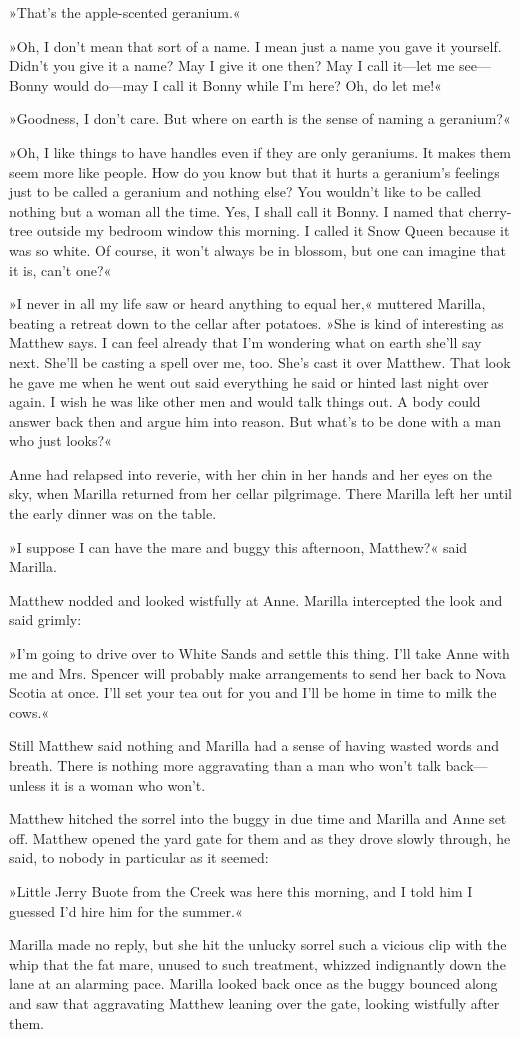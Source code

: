 »That's the apple-scented geranium.«

»Oh, I don't mean that sort of a name. I mean just a name you gave it yourself. Didn't you give it a name? May I give it one then? May I call it—let me see—Bonny would do—may I call it Bonny while I'm here? Oh, do let me!«

»Goodness, I don't care. But where on earth is the sense of naming a geranium?«

»Oh, I like things to have handles even if they are only geraniums. It makes them seem more like people. How do you know but that it hurts a geranium's feelings just to be called a geranium and nothing else? You wouldn't like to be called nothing but a woman all the time. Yes, I shall call it Bonny. I named that cherry-tree outside my bedroom window this morning. I called it Snow Queen because it was so white. Of course, it won't always be in blossom, but one can imagine that it is, can't one?«

»I never in all my life saw or heard anything to equal her,« muttered Marilla, beating a retreat down to the cellar after potatoes. »She is kind of interesting as Matthew says. I can feel already that I'm wondering what on earth she'll say next. She'll be casting a spell over me, too. She's cast it over Matthew. That look he gave me when he went out said everything he said or hinted last night over again. I wish he was like other men and would talk things out. A body could answer back then and argue him into reason. But what's to be done with a man who just looks?«

Anne had relapsed into reverie, with her chin in her hands and her eyes on the sky, when Marilla returned from her cellar pilgrimage. There Marilla left her until the early dinner was on the table.

»I suppose I can have the mare and buggy this afternoon, Matthew?« said Marilla.

Matthew nodded and looked wistfully at Anne. Marilla intercepted the look and said grimly:

»I'm going to drive over to White Sands and settle this thing. I'll take Anne with me and Mrs. Spencer will probably make arrangements to send her back to Nova Scotia at once. I'll set your tea out for you and I'll be home in time to milk the cows.«

Still Matthew said nothing and Marilla had a sense of having wasted words and breath. There is nothing more aggravating than a man who won't talk back—unless it is a woman who won't.

Matthew hitched the sorrel into the buggy in due time and Marilla and Anne set off. Matthew opened the yard gate for them and as they drove slowly through, he said, to nobody in particular as it seemed:

»Little Jerry Buote from the Creek was here this morning, and I told him I guessed I'd hire him for the summer.«

Marilla made no reply, but she hit the unlucky sorrel such a vicious clip with the whip that the fat mare, unused to such treatment, whizzed indignantly down the lane at an alarming pace. Marilla looked back once as the buggy bounced along and saw that aggravating Matthew leaning over the gate, looking wistfully after them.

